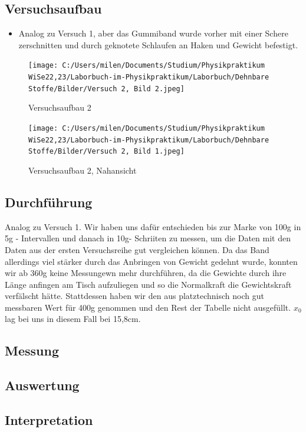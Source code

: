 \documentclass[
]{article}
\providecommand{\tightlist}{%
  \setlength{\itemsep}{0pt}\setlength{\parskip}{0pt}}
\begin{document}
\hypertarget{versuchsaufbau-1}{%
\subsection{Versuchsaufbau}\label{versuchsaufbau-1}}

\begin{itemize}
\tightlist
\item
  Analog zu Versuch 1, aber das Gummiband wurde vorher mit einer Schere
  zerschnitten und durch geknotete Schlaufen an Haken und Gewicht
  befestigt.
\end{itemize}

\begin{figure}
\centering
\texttt{[image: C:/Users/milen/Documents/Studium/Physikpraktikum WiSe22,23/Laborbuch-im-Physikpraktikum/Laborbuch/Dehnbare Stoffe/Bilder/Versuch 2, Bild 2.jpeg]}
\caption{Versuchsaufbau 2}
\end{figure}

\begin{figure}
\centering
\texttt{[image: C:/Users/milen/Documents/Studium/Physikpraktikum WiSe22,23/Laborbuch-im-Physikpraktikum/Laborbuch/Dehnbare Stoffe/Bilder/Versuch 2, Bild 1.jpeg]}
\caption{Versuchsaufbau 2, Nahansicht}
\end{figure}

\hypertarget{durchfuxfchrung-1}{%
\subsection{Durchführung}\label{durchfuxfchrung-1}}

Analog zu Versuch 1. Wir haben uns dafür entschieden bis zur Marke von
100g in 5g - Intervallen und danach in 10g- Schriiten zu messen, um die
Daten mit den Daten aus der ersten Versuchsreihe gut vergleichen können.
Da das Band allerdings viel stärker durch das Anbringen von Gewicht
gedehnt wurde, konnten wir ab 360g keine Messungewn mehr durchführen, da
die Gewichte durch ihre Länge anfingen am Tisch aufzuliegen und so die
Normalkraft die Gewichtskraft verfälscht hätte. Stattdessen haben wir
den aus platztechnisch noch gut messbaren Wert für 400g genommen und den
Rest der Tabelle nicht ausgefüllt. \(x_0\) lag bei uns in diesem Fall
bei 15,8cm.

\hypertarget{messung-1}{%
\subsection{Messung}\label{messung-1}}

\hypertarget{auswertung-1}{%
\subsection{Auswertung}\label{auswertung-1}}

\hypertarget{interpretation-1}{%
\subsection{Interpretation}\label{interpretation-1}}
\end{document}
